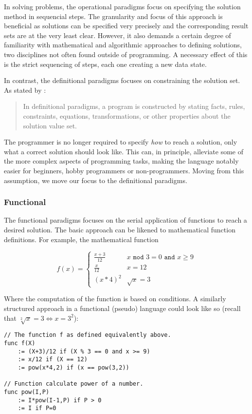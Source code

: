 In solving problems, the operational paradigms focus on specifying the solution method in sequencial steps. The granularity and focus of this approach is beneficial as solutions can be specified very precisely and the corresponding result sets are at the very least clear. However, it also demands a certain degree of familiarity with mathematical and algorithmic approaches to defining solutions, two disciplines not often found outside of programming. A necessary effect of this is the strict sequencing of steps, each one creating a new data state.

In contrast, the definitional paradigms focuses on constraining the solution set. As stated by \citep{paradigms1992}:

\begin{quote}
In definitional paradigms, a program is constructed by stating facts, rules, constraints, equations, transformations, or other properties about the solution value set.
\end{quote}

The programmer is no longer required to specify \emph{how} to reach a solution, only what a correct solution should look like. This can, in principle, alleviate some of the more complex aspects of programming tasks, making the language notably easier for beginners, hobby programmers or non-programmers. Moving from this assumption, we move our focus to the definitional paradigms.

\subsubsection*{Functional}
The functional paradigms focuses on the serial application of functions to reach a desired solution. The basic approach can be likened to mathematical function definitions. For example, the mathematical function

\[
f(x) =
\begin{cases} \frac{x+3}{12} & x \texttt{ mod } 3 = 0 \texttt{ and } x \geq 9
\\
\frac{x}{12} & x = 12
\\
(x * 4)^2 & \sqrt{x} = 3
\end{cases}
\]

Where the computation of the function is based on conditions. A similarly structured approach in a functional (pseudo) language could look like so (recall that $\sqrt[2]{x} = 3 \Leftrightarrow x = 3^2$):

\begin{lstlisting}
// The function f as defined equivalently above.
func f(X)
	:= (X+3)/12 if (X % 3 == 0 and x >= 9)
	:= x/12 if (X == 12)
	:= pow(x*4,2) if (x == pow(3,2))

// Function calculate power of a number.
func pow(I,P)
	:= I*pow(I-1,P) if P > 0
	:= I if P=0
\end{lstlisting}

